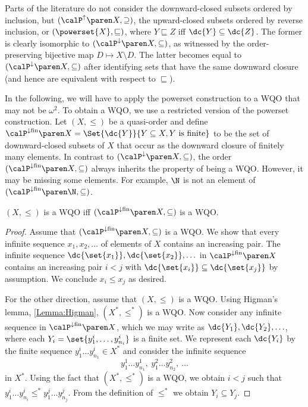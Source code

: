 \documentclass[../../diss.tex]{subfiles}
\begin{document}
Parts of the literature do not consider the downward-closed subsets ordered by inclusion, but $(\pwrsetup{X},\supseteq)$, the upward-closed subsets ordered by reverse inclusion, or $(\powerset{X},\sqsubseteq)$, where $Y \sqsubseteq Z$ iff $\dc{Y} \subseteq \dc{Z}$.
The former is clearly isomorphic to $(\pwrsetdown{X},\subseteq)$, as witnessed by the order-preserving bijective map $D \mapsto X \setminus D$.
The latter becomes equal to $(\pwrsetdown{X},\subseteq)$ after identifying sets that have the same downward closure (and hence are equivalent with respect to $\sqsubseteq$).


In the following, we will have to apply the powerset construction to a WQO that may not be $\omega^2$.
To obtain a WQO, we use a restricted version of the powerset construction.
Let $(X,\leq)$ be a quasi-order and define $\pwrsetdownfin{X} = \Set{ \dc{Y} }{ Y \subseteq X, Y \text{ is finite}}$ to be the set of downward-closed subsets of $X$ that occur as the downward closure of finitely many elements.
In contrast to $(\pwrsetdown{X},\subseteq)$, the order $(\pwrsetdownfin{X},\subseteq)$ always inherits the property of being a WQO.\@
However, it may be missing some elements.
For example, $\N$ is not an element of $(\pwrsetdownfin{\N},\subseteq)$.

\begin{lemma}%
\label{Lemma:WSTSPwrsetdownfin}%
    $(X,\leq)$ is a WQO iff $(\pwrsetdownfin{X},\subseteq)$ is a WQO.\@
\end{lemma}

\begin{proof}
    Assume that  $(\pwrsetdownfin{X}, {\subseteq})$ is a WQO.\@
    We show that every infinite sequence $x_1, x_2, \dots$ of elements of $X$ contains an increasing pair.
    The infinite sequence
    $\dc{\set{x_1}}, \dc{\set{x_2}},\ldots $
    in $\pwrsetdownfin{X}$ contains an increasing pair $i < j$ with $\dc{\set{x_i}} \subseteq \dc{\set{x_j}}$ by assumption.
    We conclude $x_i \leq x_j$ as desired.

    For the other direction, assume that $(X, \leq)$ is a WQO.\@
    Using Higman's lemma, \cref{Lemma:Higman}, $(X^*,\leq^*)$ is a WQO.\@
    Now consider any infinite sequence in $\pwrsetdownfin{X}$, which we may write as $\dc{Y_1},\dc{Y_2},\ldots$, where each
    $Y_i = \set{ y^i_1, \ldots ,y^i_{n_i} }$ is a finite set.
    We represent each $\dc{Y_i}$ by the finite sequence $y^i_1 \ldots y^i_{n_1} \in X^*$ and consider the infinite sequence
    \[
        y^1_1 \dots y^1_{n_1}, \ y^2_1 \dots y^2_{n_2}, \ \ldots
    \]
    in $X^*$.
    Using the fact that $(X^*,\leq^*)$ is a WQO, we obtain $i < j$ such that
    $y^i_1 \dots y^i_{n_i} \leq^* y^j_1 \dots y^j_{n_j}$.
    From the definition of $\leq^*$ we obtain $Y_i \subseteq Y_j$.
\end{proof}
\end{document}
